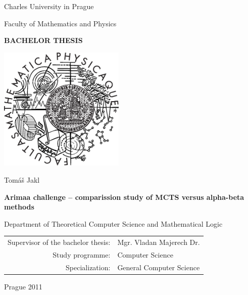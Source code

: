 \documentclass[12pt,a4paper,fleqn]{report}
\begin{document}


\pagestyle{empty}
\begin{center}

\large

Charles University in Prague

\medskip

Faculty of Mathematics and Physics

\vfill

{\bf\Large BACHELOR THESIS}

\vfill

\centerline{\mbox{\includegraphics[width=60mm]{logo.eps}}}

\vfill
\vspace{5mm}

{\LARGE Tomáš Jakl}

\vspace{15mm}

{\LARGE\bfseries Arimaa challenge -- comparission study of MCTS versus alpha-beta methods}

\vfill

Department of Theoretical Computer Science and Mathematical Logic

\vfill

\begin{tabular}{rl}

Supervisor of the bachelor thesis: & Mgr. Vladan Majerech Dr. \\
\noalign{\vspace{2mm}}
Study programme: & Computer Science \\
\noalign{\vspace{2mm}}
Specialization: & General Computer Science \\
\end{tabular}

\vfill

Prague 2011

\end{center}
\end{document}
